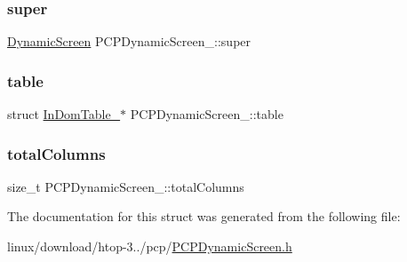 \subsubsection{\texorpdfstring{super}{super}}
{\footnotesize\ttfamily \hyperlink{DynamicScreen_8h_a9b10b5a0b32fbb6fe6af7f0571ae6b25}{Dynamic\+Screen} P\+C\+P\+Dynamic\+Screen\+\_\+\+::super}

\mbox{\label{structPCPDynamicScreen___a014d364b7f49e162b27aa1806b20cd98}} 
\subsubsection{\texorpdfstring{table}{table}}
{\footnotesize\ttfamily struct \hyperlink{structInDomTable__}{In\+Dom\+Table\+\_\+}$\ast$ P\+C\+P\+Dynamic\+Screen\+\_\+\+::table}

\mbox{\label{structPCPDynamicScreen___a27364df804ffef77240461a889f606fc}} 
\subsubsection{\texorpdfstring{total\+Columns}{totalColumns}}
{\footnotesize\ttfamily size\+\_\+t P\+C\+P\+Dynamic\+Screen\+\_\+\+::total\+Columns}



The documentation for this struct was generated from the following file\+:\begin{DoxyCompactItemize}
\item 
linux/download/htop-\/3../pcp/\hyperlink{PCPDynamicScreen_8h}{P\+C\+P\+Dynamic\+Screen.\+h}\end{DoxyCompactItemize}
